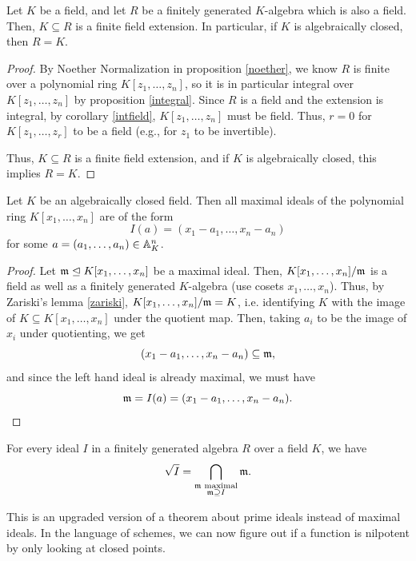 \documentclass[12pt]{article}
\begin{document}
\begin{cor}\label{zariski}
    Let $K$ be a field, and let $R$ be a finitely generated $K$-algebra which is also a field.
    Then, $K\subseteq R$ is a finite field extension. In particular, if $K$ is algebraically closed, then $R=K$.
\end{cor}

\begin{proof}
    By Noether Normalization in proposition \ref{noether}, we know $R$ is finite over a polynomial ring $K[z_1,\dots,z_n]$, so it is in particular integral over $K[z_1,\dots,z_n]$ by proposition \ref{integral}. Since $R$ is a field and the extension is integral, by corollary \ref{intfield}, $K[z_1,\dots,z_n]$ must be field. Thus, $r=0$ for $K[z_1,\dots,z_r]$ to be a field (e.g., for $z_1$ to be invertible).
    
    Thus, $K\subseteq R$ is a finite field extension, and if $K$ is algebraically closed, this implies $R=K$.
\end{proof}

\begin{cor}\label{weak}
    Let $K$ be an algebraically closed field. Then all maximal ideals of the polynomial ring $K[x_1,\dots,x_n]$ are of the form
    \[I(a) = (x_1-a_1, \dots, x_n-a_n)\]
    for some $a=(a_1,\dots,a_n)\in \mathbb{A}_K^n$.
\end{cor}

\begin{proof}
    Let $\mathfrak{m}\trianglelefteq K[x_1,\dots,x_n]$ be a maximal ideal. Then, $K[x_1,\dots,x_n]/\mathfrak{m}$ is a field as well as a finitely generated $K$-algebra (use cosets $x_1,\dots,x_n$). Thus, by Zariski's lemma \ref{zariski}, $K[x_1,\dots,x_n]/\mathfrak{m} = K$, i.e. identifying $K$ with the image of $K\subseteq K[x_1,\dots,x_n]$ under the quotient map. Then, taking $a_i$ to be the image of $x_i$ under quotienting, we get
    \[(x_1-a_1,\dots,x_n-a_n) \subseteq \mathfrak{m},\]
    and since the left hand ideal is already maximal, we must have
    \[\mathfrak{m} = I(a) = (x_1-a_1,\dots,x_n-a_n).\]
\end{proof}

\begin{cor}\label{radpoly}
    For every ideal $I$ in a finitely generated algebra $R$ over a field $K$, we have
    \[\sqrt{I} = \bigcap_{\substack{\mathfrak{m} \text{ maximal}\\ \mathfrak{m} \supseteq I}} \mathfrak{m}.\]
\end{cor}

This is an upgraded version of a theorem about prime ideals instead of maximal ideals. In the language of schemes, we can now figure out if a function is nilpotent by only looking at closed points.
\end{document}
